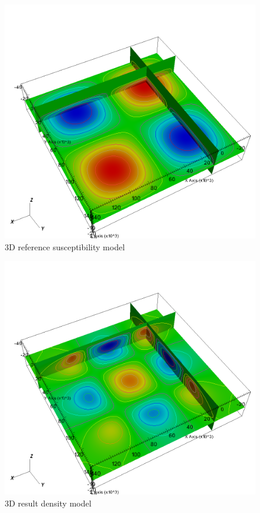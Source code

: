\begin{figure}
\centering
\includegraphics[width=\textwidth]{joint3D4mag6grav-mref.png}
\caption{3D reference susceptibility model}

\end{figure}


\begin{figure}
\centering
\includegraphics[width=\textwidth]{joint3D4mag6grav-g.png}
\caption{3D result density model}

\end{figure}



